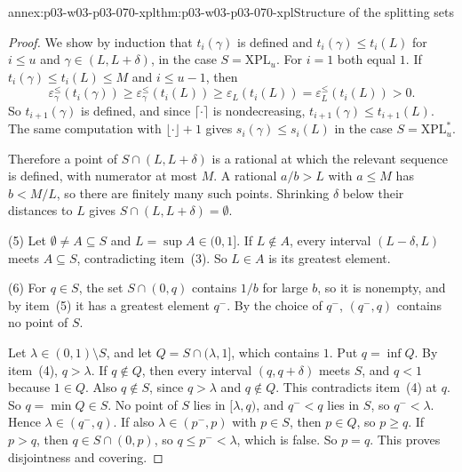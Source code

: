 \begin{annexitem}{annex:p03-w03-p03-070-xpl}{thm:p03-w03-p03-070-xpl}{Structure of the splitting sets}
\begin{proof}
We show by induction that \(t_i(\gamma)\) is defined and
\(t_i(\gamma)\leq t_i(L)\) for \(i\leq u\) and \(\gamma\in(L,L+\delta)\), in
the case \(S=\mathrm{XPL}_u\).  For \(i=1\) both equal \(1\).  If
\(t_i(\gamma)\leq t_i(L)\leq M\) and \(i\leq u-1\), then
\[
 \varepsilon^{\leq}_\gamma(t_i(\gamma))\geq\varepsilon^{\leq}_\gamma(t_i(L))
 \geq\varepsilon_L(t_i(L))=\varepsilon^{\leq}_L(t_i(L))>0 .
\]
So \(t_{i+1}(\gamma)\) is defined, and since \(\lceil\cdot\rceil\) is
nondecreasing, \(t_{i+1}(\gamma)\leq t_{i+1}(L)\).  The same computation with
\(\lfloor\cdot\rfloor+1\) gives \(s_i(\gamma)\leq s_i(L)\) in the case
\(S=\mathrm{XPL}^\ast_u\).

Therefore a point of \(S\cap(L,L+\delta)\) is a rational at which the
relevant sequence is defined, with numerator at most \(M\).  A rational
\(a/b>L\) with \(a\leq M\) has \(b<M/L\), so there are finitely many such
points.  Shrinking \(\delta\) below their distances to \(L\) gives
\(S\cap(L,L+\delta)=\emptyset\).

(5) Let \(\emptyset\neq A\subseteq S\) and \(L=\sup A\in(0,1]\).  If
\(L\notin A\), every interval \((L-\delta,L)\) meets \(A\subseteq S\),
contradicting item~(3).  So \(L\in A\) is its greatest element.

(6) For \(q\in S\), the set \(S\cap(0,q)\) contains \(1/b\) for large \(b\),
so it is nonempty, and by item~(5) it has a greatest element \(q^-\).  By the
choice of \(q^-\), \((q^-,q)\) contains no point of \(S\).

Let \(\lambda\in(0,1)\setminus S\), and let
\(Q=S\cap(\lambda,1]\), which contains \(1\).  Put \(q=\inf Q\).  By
item~(4), \(q>\lambda\).  If \(q\notin Q\), then every interval
\((q,q+\delta)\) meets \(S\), and \(q<1\) because \(1\in Q\).  Also
\(q\notin S\), since \(q>\lambda\) and \(q\notin Q\).  This contradicts
item~(4) at \(q\).  So \(q=\min Q\in S\).  No point of \(S\) lies in
\([\lambda,q)\), and \(q^-<q\) lies in \(S\), so \(q^-<\lambda\).  Hence
\(\lambda\in(q^-,q)\).  If also \(\lambda\in(p^-,p)\) with \(p\in S\), then
\(p\in Q\), so \(p\geq q\).  If \(p>q\), then \(q\in S\cap(0,p)\), so
\(q\leq p^-<\lambda\), which is false.  So \(p=q\).  This proves
disjointness and covering.
\end{proof}
\end{annexitem}


